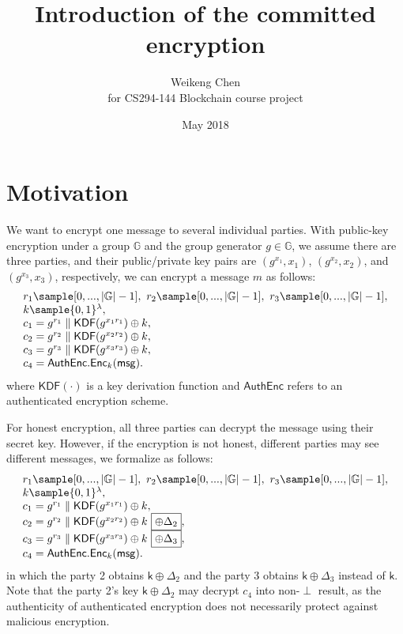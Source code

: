 \documentclass{article}
\title{Introduction of the committed encryption}
\author{Weikeng Chen\\
\vspace{0.12em}
for CS294-144 Blockchain course project}
\date{May 2018}
\begin{document}
\maketitle

\section{Motivation}

We want to encrypt one message to several individual parties. With public-key encryption under a group $\mathbb{G}$ and the group generator $g\in\mathbb{G}$, we assume there are three parties, and their public/private key pairs are $(g^{x_1},x_1)$,  $(g^{x_2},x_2)$, and $(g^{x_3},x_3)$, respectively, we can encrypt a message $m$ as follows:
\[
\begin{array}{l}
r_1\sample[0,...,|\mathbb{G}|-1],~r_2\sample[0,...,|\mathbb{G}|-1],~r_3\sample[0,...,|\mathbb{G}|-1],\\
k\sample\{0,1\}^\lambda,\\
c_1=g^{r_1}\parallel\mathsf{KDF}(g^{x_1r_1})\oplus k,\\
c_2=g^{r_2}\parallel\mathsf{KDF}(g^{x_2r_2})\oplus k,\\
c_3=g^{r_3}\parallel\mathsf{KDF}(g^{x_3r_3})\oplus k,\\
c_4=\mathsf{AuthEnc}.\mathsf{Enc}_k(\mathsf{msg}).
\end{array}
\]
where $\mathsf{KDF}(\cdot)$ is a key derivation function and $\mathsf{AuthEnc}$ refers to an authenticated encryption scheme.

For honest encryption, all three parties can decrypt the message using their secret key. However, if the encryption is not honest, different parties may see different messages, we formalize as follows:
\[
\begin{array}{l}
r_1\sample[0,...,|\mathbb{G}|-1],~r_2\sample[0,...,|\mathbb{G}|-1],~r_3\sample[0,...,|\mathbb{G}|-1],\\
k\sample\{0,1\}^\lambda,\\
c_1=g^{r_1}\parallel\mathsf{KDF}(g^{x_1r_1})\oplus k,\\
c_2=g^{r_2}\parallel\mathsf{KDF}(g^{x_2r_2})\oplus k~\boxed{\oplus\Delta_2},\\
c_3=g^{r_3}\parallel\mathsf{KDF}(g^{x_3r_3})\oplus k~\boxed{\oplus\Delta_3},\\
c_4=\mathsf{AuthEnc}.\mathsf{Enc}_k(\mathsf{msg}).
\end{array}
\]
in which the party 2 obtains $\mathsf{k}\oplus\Delta_2$ and the party 3 obtains $\mathsf{k}\oplus\Delta_3$ instead of $\mathsf{k}$. Note that the party 2's key $\mathsf{k}\oplus\Delta_2$ may decrypt $c_4$ into non-$\perp$ result, as the authenticity of authenticated encryption does not necessarily protect against malicious encryption.
\end{document}
